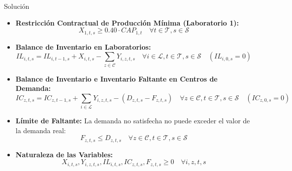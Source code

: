 \documentclass[11pt, a4paper]{article}
\begin{document}
\begin{ejercicio}{Solución}
\begin{itemize}
    \item \textbf{Restricción Contractual de Producción Mínima (Laboratorio 1):}
    \begin{equation}
      X_{1,t,s} \ge 0.40 \cdot CAP_{1,t} \quad \forall t \in \mathcal{T}, s \in \mathcal{S}
    \end{equation}

    \item \textbf{Balance de Inventario en Laboratorios:}
    \begin{equation}
      IL_{i,t,s} = IL_{i,t-1,s} + X_{i,t,s} - \sum_{z \in \mathcal{C}} Y_{i,z,t,s} \quad \forall i \in \mathcal{L}, t \in \mathcal{T}, s \in \mathcal{S} \quad (IL_{i,0,s} = 0)
    \end{equation}

    \item \textbf{Balance de Inventario e Inventario Faltante en Centros de Demanda:}
    \begin{equation}
      IC_{z,t,s} = IC_{z,t-1,s} + \sum_{i \in \mathcal{L}} Y_{i,z,t,s} - (D_{z,t,s} - F_{z,t,s}) \quad \forall z \in \mathcal{C}, t \in \mathcal{T}, s \in \mathcal{S} \quad (IC_{z,0,s} = 0)
    \end{equation}

    \item \textbf{Límite de Faltante:}
    La demanda no satisfecha no puede exceder el valor de la demanda real:
    \begin{equation}
      F_{z,t,s} \le D_{z,t,s} \quad \forall z \in \mathcal{C}, t \in \mathcal{T}, s \in \mathcal{S}
    \end{equation}

    \item \textbf{Naturaleza de las Variables:}
    \begin{equation}
      X_{i,t,s}, Y_{i,z,t,s}, IL_{i,t,s}, IC_{z,t,s}, F_{z,t,s} \ge 0 \quad \forall i, z, t, s
    \end{equation}
  \end{itemize}

\end{ejercicio}

\newpage


\newpage
\end{document}
